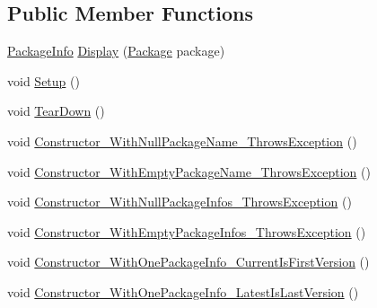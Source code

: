 \subsection*{Public Member Functions}
\begin{DoxyCompactItemize}
\item 
\mbox{\hyperlink{class_unity_editor_1_1_package_manager_1_1_u_i_1_1_package_info}{Package\+Info}} \mbox{\hyperlink{class_unity_editor_1_1_package_manager_1_1_u_i_1_1_tests_1_1_package_tests_a7a200103be4867c4cbd373d3d768607d}{Display}} (\mbox{\hyperlink{class_unity_editor_1_1_package_manager_1_1_u_i_1_1_package}{Package}} package)
\item 
void \mbox{\hyperlink{class_unity_editor_1_1_package_manager_1_1_u_i_1_1_tests_1_1_package_tests_aac79965e0fd129079c1d535214d34ea9}{Setup}} ()
\item 
void \mbox{\hyperlink{class_unity_editor_1_1_package_manager_1_1_u_i_1_1_tests_1_1_package_tests_a1b0b13f585117f97780e36d6d41635be}{Tear\+Down}} ()
\item 
void \mbox{\hyperlink{class_unity_editor_1_1_package_manager_1_1_u_i_1_1_tests_1_1_package_tests_a8a3843c591aeee904e7f8102ce083cfd}{Constructor\+\_\+\+With\+Null\+Package\+Name\+\_\+\+Throws\+Exception}} ()
\item 
void \mbox{\hyperlink{class_unity_editor_1_1_package_manager_1_1_u_i_1_1_tests_1_1_package_tests_ade50bb9418c7c1a6975dc38f71dd1367}{Constructor\+\_\+\+With\+Empty\+Package\+Name\+\_\+\+Throws\+Exception}} ()
\item 
void \mbox{\hyperlink{class_unity_editor_1_1_package_manager_1_1_u_i_1_1_tests_1_1_package_tests_a346cfcef79d969b27f5711395424fdc2}{Constructor\+\_\+\+With\+Null\+Package\+Infos\+\_\+\+Throws\+Exception}} ()
\item 
void \mbox{\hyperlink{class_unity_editor_1_1_package_manager_1_1_u_i_1_1_tests_1_1_package_tests_a5bb0a3413d5cc9940db10387dd66b2d4}{Constructor\+\_\+\+With\+Empty\+Package\+Infos\+\_\+\+Throws\+Exception}} ()
\item 
void \mbox{\hyperlink{class_unity_editor_1_1_package_manager_1_1_u_i_1_1_tests_1_1_package_tests_a995258491bcad1e1e88b09f288677379}{Constructor\+\_\+\+With\+One\+Package\+Info\+\_\+\+Current\+Is\+First\+Version}} ()
\item 
void \mbox{\hyperlink{class_unity_editor_1_1_package_manager_1_1_u_i_1_1_tests_1_1_package_tests_a469e410a12a86ca4044ed2d1ef0f4c09}{Constructor\+\_\+\+With\+One\+Package\+Info\+\_\+\+Latest\+Is\+Last\+Version}} ()
\item 

\end{DoxyCompactItemize}

